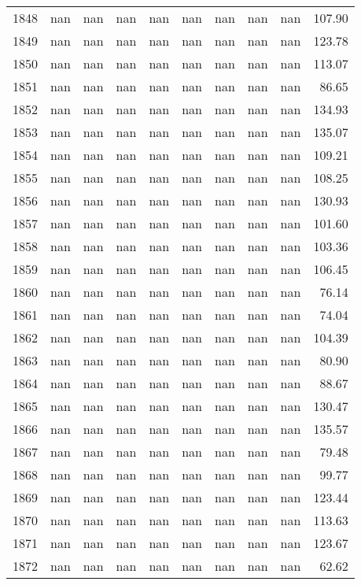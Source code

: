 \begin{tabular}{lrrrrrrrrr}
1848 & nan & nan & nan & nan & nan & nan & nan & nan & 107.90 \\
1849 & nan & nan & nan & nan & nan & nan & nan & nan & 123.78 \\
1850 & nan & nan & nan & nan & nan & nan & nan & nan & 113.07 \\
1851 & nan & nan & nan & nan & nan & nan & nan & nan & 86.65 \\
1852 & nan & nan & nan & nan & nan & nan & nan & nan & 134.93 \\
1853 & nan & nan & nan & nan & nan & nan & nan & nan & 135.07 \\
1854 & nan & nan & nan & nan & nan & nan & nan & nan & 109.21 \\
1855 & nan & nan & nan & nan & nan & nan & nan & nan & 108.25 \\
1856 & nan & nan & nan & nan & nan & nan & nan & nan & 130.93 \\
1857 & nan & nan & nan & nan & nan & nan & nan & nan & 101.60 \\
1858 & nan & nan & nan & nan & nan & nan & nan & nan & 103.36 \\
1859 & nan & nan & nan & nan & nan & nan & nan & nan & 106.45 \\
1860 & nan & nan & nan & nan & nan & nan & nan & nan & 76.14 \\
1861 & nan & nan & nan & nan & nan & nan & nan & nan & 74.04 \\
1862 & nan & nan & nan & nan & nan & nan & nan & nan & 104.39 \\
1863 & nan & nan & nan & nan & nan & nan & nan & nan & 80.90 \\
1864 & nan & nan & nan & nan & nan & nan & nan & nan & 88.67 \\
1865 & nan & nan & nan & nan & nan & nan & nan & nan & 130.47 \\
1866 & nan & nan & nan & nan & nan & nan & nan & nan & 135.57 \\
1867 & nan & nan & nan & nan & nan & nan & nan & nan & 79.48 \\
1868 & nan & nan & nan & nan & nan & nan & nan & nan & 99.77 \\
1869 & nan & nan & nan & nan & nan & nan & nan & nan & 123.44 \\
1870 & nan & nan & nan & nan & nan & nan & nan & nan & 113.63 \\
1871 & nan & nan & nan & nan & nan & nan & nan & nan & 123.67 \\
1872 & nan & nan & nan & nan & nan & nan & nan & nan & 62.62 \\

\end{tabular}
